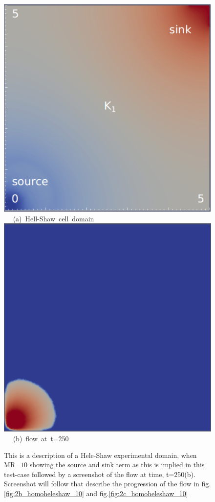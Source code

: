 \begin{figure}[ht] 
\vbox{
\hbox{\hspace{3.5cm}
\includegraphics[width=.5\textwidth]{./Pics1/Saffman_homogeneous/saffman_homo_fixed_1.pdf} 
}
\vspace{0.0cm}
\hbox{\hspace{5.0cm} (a) Hell-Shaw cell domain   
}
\vspace{0.25cm}
\hbox{\hspace{3.5cm}
\includegraphics[width=.5\textwidth]{./Pics1/Saffman_homogeneous/saffman_homo_fixed_250_1.pdf}
}
\vspace{0.0cm}
\hbox{\hspace{5.0cm} (b) flow at t=250  
}
}     
\caption{This is a description of a Hele-Shaw experimental domain, when MR=$10$ showing the source and sink term as this is implied in this test-case followed by a screenshot of the flow at time, t=250(b). Screenshot will follow that describe the progression of the flow in fig.\ref{fig:2b_homoheleshaw_10} and fig.\ref{fig:2c_homoheleshaw_10}}
\label{fig:2a_homoheleshaw_10}
\end{figure}



